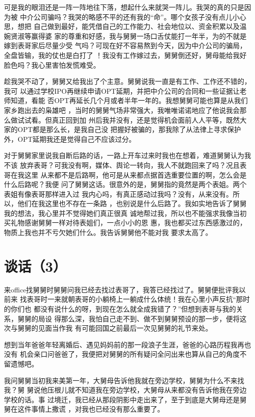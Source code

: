 \documentclass[12pt]{book}
\begin{document}
可是我的眼泪还是一阵一阵地往下落，想起什么来就哭一阵儿。我哭的真的只是因为被
中介公司骗吗？我哭的略感不平的还有我的“命”。哪个女孩子没有点儿小心思，想把
自己做到最好，能凭借自己的工作能力、社会地位以、资金积累以及温婉贤淑等赢得婆
家的尊重和好感，我与舅舅一场口舌仗能打一年半，为的不就是嫁到表哥家后尽量少受
气吗？可现在好不容易熬到今天，因为中介公司的骗局，全盘皆输，我的仗也是白打了
！我没有工作嫁过去，舅舅倒还好，舅母能给我好脸色吗？我心里害怕发慌难受。

趁我哭不动了，舅舅又给我出了个主意。舅舅说我一直是有工作、工作还不错的，我可
以通过学校IPO再继续申请OPT延期，并把中介公司的合同和一些证据让老师知道，看能
否OPT再延长几个月或者半年一年的。我想舅舅可能也算是从我们家乡跑出去的枭雄吧
，当时的舅舅气场非常强大，我唯唯诺诺地应了他说我会那么做试试看。但真正回到加
州后我并没有，还是觉得机会面前人人平等，既然大家的OPT都是那么长，是我自己没
把握好被骗的，那我除了从法律上寻求保护外，OPT延期我还是觉得自己不应该过分。

对于舅舅家里说我自断后路的话，一路上开车过来时我也在想着，难道舅舅认为我不该
放弃表哥？可我没有啊，媒体、舆论一转向，我人不就跑回来了吗？况且表哥在我这里
从来都不是后路啊，他可是从来都点据首选重要位置的啊，怎么会是什么后路呢？我便
问了舅舅这话。很意外的是，舅舅指的竟然是两个表姐。两个表姐有像表哥那样进入过
我内心吗，有真正感动过我吗？没有，从来没有。所以，他们在我这里也不存在一条路
，也别说是什么后路了。我如实地告诉了舅舅我的想法，我心里并不觉得她们真正很真
诚地帮过我，所以也不能强求我像当初买礼物感谢舅舅一样对待表姐们，一点小小的恩
惠，我也都买过东西感激过的，物质上我也并不亏欠她们什么。我告诉舅舅他不能对我
要求太高了。
\section{谈话（3）}
\label{sec-9-75}

来office找舅舅时舅舅问我已经去找过表哥了，我答已经找过了。舅舅便批评我以前来
找表哥时一来就朝表哥的小躺椅上一躺成什么体统！我在心里小声反抗“那时的你们也
都没有说什么的呀，到现在怎么就全成我错了？”但想到表哥与我的关系，舅舅的局设
得那么深，我怕自己走不到、做不到舅舅预设的那一步，便将这次与舅舅的见面当作我
有可能回国之前最后一次见舅舅的礼节来处。

想到当年爸爸年轻离婚后、遇见妈妈前的那一段浪子生涯，爸爸的心路历程我再也没有
机会亲口问爸爸了，我便把对舅舅的所有疑问全问出来也算从自己的角度不留遗憾吧。

我问舅舅当初我来美第一年，大舅母告诉他我就在旁边学校，舅舅为什么不来找我？舅
舅说他压根儿就不知道我在旁边学校，大舅母从来都没有告诉他我在旁边学校的话。事
过境迁，我已经从那段阴影中走出来了，至于到底是大舅母还是舅舅在这件事情上撒谎
，对我也已经没有那么重要了。
\end{document}
